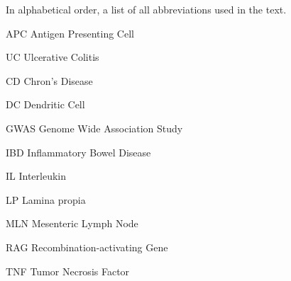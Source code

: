 \documentclass[../main.tex]{subfiles}
\begin{document}
In alphabetical order, a list of all abbreviations used in the text. 

APC \quad \quad \quad Antigen Presenting Cell

UC \quad \quad \quad Ulcerative Colitis

CD \quad \quad \quad Chron's Disease

DC \quad \quad \quad Dendritic Cell

GWAS \quad \quad \quad Genome Wide Association Study

IBD \quad \quad \quad Inflammatory Bowel Disease

IL \quad \quad \quad Interleukin

LP \quad \quad \quad Lamina propia

MLN \quad \quad \quad Mesenteric Lymph Node

RAG \quad \quad \quad Recombination-activating Gene

TNF \quad \quad \quad Tumor Necrosis Factor
\end{document}
